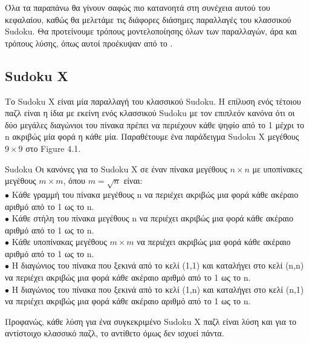 \documentclass[oneside,12pt]{book}
\theoremstyle{definition}
\begin{document}
Όλα τα παραπάνω θα γίνουν σαφώς πιο κατανοητά στη συνέχεια αυτού του κεφαλαίου, καθώς θα μελετάμε τις διάφορες διάσημες παραλλαγές του κλασσικού Sudoku. Θα προτείνουμε τρόπους μοντελοποίησης όλων των παραλλαγών, άρα και τρόπους λύσης, όπως αυτοί προέκυψαν από το \cite{3}.

\subsection{Sudoku X}

Το Sudoku X είναι μία παραλλαγή του κλασσικού Sudoku. Η επίλυση ενός τέτοιου παζλ είναι η ίδια με εκείνη ενός κλασσικού Sudoku με τον επιπλεόν κανόνα ότι οι δύο μεγάλες διαγώνιοι του πίνακα πρέπει να περιέχουν κάθε ψηφίο από το 1 μέχρι το n ακριβώς μία φορά η κάθε μία. Παραθέτουμε ένα παράδειγμα Sudoku X μεγέθους \(9 \times 9 \) στο Figure 4.1.\par

\begin{mytheorem}{Sudoku}{}
	Οι κανόνες για το Sudoku X σε έναν πίνακα μεγέθους \(n \times n\) με υποπίνακες μεγέθους \(m \times m\), 	όπου \(m = \sqrt{n}\) είναι: \\
	\(\bullet\) Κάθε γραμμή του πίνακα μεγέθους n να περιέχει ακριβώς μια φορά κάθε ακέραιο αριθμό από το 1 ως το n. \\
	\(\bullet\) Κάθε στήλη του πίνακα μεγέθους n να περιέχει ακριβώς μια φορά κάθε ακέραιο αριθμό από το 1 ως το n. \\
	\(\bullet\) Κάθε υποπίνακας μεγέθους \(m \times m\) να περιέχει ακριβώς μια φορά κάθε ακέραιο αριθμό από το 1 ως το n. \\
	\(\bullet\) Η διαγώνιος του πίνακα που ξεκινά από το κελί (1,1) και καταλήγει στο κελί (n,n) να περιέχει ακριβώς μια φορά κάθε ακέραιο αριθμό από το 1 ως το n. \\
	\(\bullet\) Η διαγώνιος του πίνακα που ξεκινά από το κελί (1,n) και καταλήγει στο κελί (n,1) να περιέχει ακριβώς μια φορά κάθε ακέραιο αριθμό από το 1 ως το n. \\

\end{mytheorem}

Προφανώς, κάθε λύση για ένα συγκεκριμένο Sudoku X παζλ είναι λύση και για το αντίστοιχο κλασσικό παζλ, το αντίθετο όμως δεν ισχυεί πάντα. \par
\end{document}
